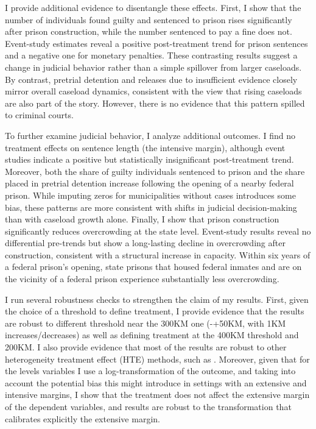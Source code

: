 I provide additional evidence to disentangle these effects. First, I show that the number of individuals found guilty and sentenced to prison rises significantly after prison construction, while the number sentenced to pay a fine does not. Event-study estimates reveal a positive post-treatment trend for prison sentences and a negative one for monetary penalties. These contrasting results suggest a change in judicial behavior rather than a simple spillover from larger caseloads. By contrast, pretrial detention and releases due to insufficient evidence closely mirror overall caseload dynamics, consistent with the view that rising caseloads are also part of the story. However, there is no evidence that this pattern spilled to criminal courts.

To further examine judicial behavior, I analyze additional outcomes. I find no treatment effects on sentence length (the intensive margin), although event studies indicate a positive but statistically insignificant post-treatment trend. Moreover, both the share of guilty individuals sentenced to prison and the share placed in pretrial detention increase following the opening of a nearby federal prison. While imputing zeros for municipalities without cases introduces some bias, these patterns are more consistent with shifts in judicial decision-making than with caseload growth alone. Finally, I show that prison construction significantly reduces overcrowding at the state level. Event-study results reveal no differential pre-trends but show a long-lasting decline in overcrowding after construction, consistent with a structural increase in capacity. Within six years of a federal prison’s opening, state prisons that housed federal inmates and are on the vicinity of a federal prison experience substantially less overcrowding.

I run several robustness checks to strengthen the claim of my results. First, given the choice of a threshold to define treatment, I provide evidence that the results are robust to different threshold near the 300KM one (-+50KM, with 1KM increases/decreases) as well as defining treatment at the 400KM threshold and 200KM. I also provide evidence that most of the results are robust to other heterogeneity treatment effect (HTE) methods, such as \citep{Gardner, SunAb, Borusyak-DIDImp, Liu-FECT}. Moreover, given that for the levels variables I use a log-transformation of the outcome, and taking into account the potential bias this might introduce in settings with an extensive and intensive margins, I show that the treatment does not affect the extensive margin of the dependent variables, and results are robust to the \cite{ChenRoth2024} transformation that calibrates explicitly the extensive margin.


